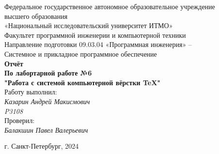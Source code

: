 \documentclass[main.tex]{subfiles}
\begin{document}
\pagestyle{empty}
\begin{center}

\large
Федеральное государственное автономное образовательное учреждение  \\
высшего образования \\
«Национальный исследовательский университет ИТМО» \\
Факультет программной инженерии и компьютерной техники \\
Направление подготовки 09.03.04 «Программная инженерия» – \\
Системное и прикладное программное обеспечение \\
\vspace{5cm}
\textbf{Отчёт} \\
\vspace{0mm}
\textbf{По лабортарной работе №6} \\
\textbf{"Работа с системой компьютерной вёрстки TeX"} \\
\vspace{3cm}
\leftskip=9cm
Работу выполнил: \\
\textit{Казарин Андрей Макисмович \\ P3108 \\}
\vspace{1cm}
Проверил: \\
\textit{Балакшин Павел Валерьевич} \\
\vfill
\begin{center}
г. Санкт-Петербург, 2024 \\
\end{center}
\end{center}
\end{document}
